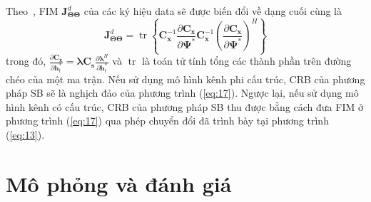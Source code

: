 Theo~\cite{Kay1993}, FIM $\mathbf{J}_{\boldsymbol{\Theta} \boldsymbol{\Theta}}^{d}$ của các ký hiệu data sẽ được biến đổi về dạng cuối cùng là
\begin{equation}
    \mathbf{J}_{\boldsymbol{\Theta} \boldsymbol{\Theta}}^{d}=\operatorname{tr}\left\{\mathbf{C}_{\mathbf{x}}^{-1} \frac{\partial \mathbf{C}_{\mathbf{x}}}{\partial \boldsymbol{\Psi}^{*}} \mathbf{C}_{\mathbf{x}}^{-1}\left(\frac{\partial \mathbf{C}_{\mathbf{x}}}{\partial \boldsymbol{\Psi}^{*}}\right)^{H}\right\}
\end{equation}
trong đó, $\frac{\partial \mathbf{C}_{\mathbf{x}}}{\partial \mathbf{h}_{t}^{*}}=\boldsymbol{\lambda} \mathbf{C}_{\mathbf{s}} \frac{\partial \boldsymbol{\lambda}^{H}}{\partial \mathbf{h}_{t}^{*}}$ và $\operatorname{tr}$ là toán tử tính tổng các thành phần trên đường chéo của một ma trận. Nếu sử dụng mô hình kênh phi cấu trúc, CRB của phương pháp SB sẽ là nghịch đảo của phương trình (\ref{eq:17}). Ngược lại, nếu sử dụng mô hình kênh có cấu trúc, CRB của phương pháp SB thu được bằng cách đưa FIM ở phương trình (\ref{eq:17}) qua phép chuyển đổi đã trình bày tại phương trình (\ref{eq:13}).

\section{Mô phỏng và đánh giá}\label{SR}

